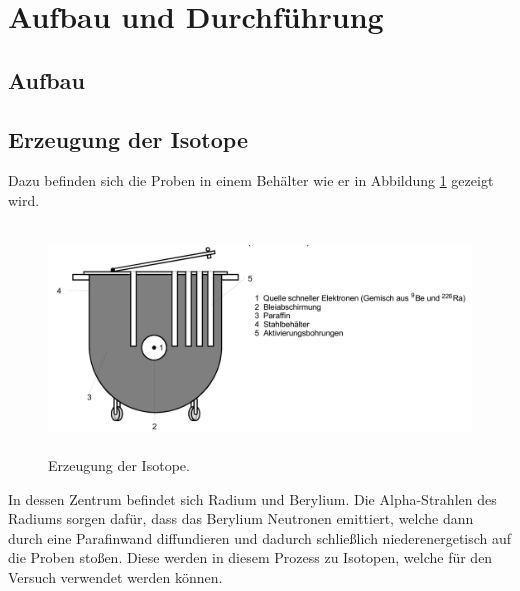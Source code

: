 \section{Aufbau und Durchführung}
\subsection{Aufbau}
\label{sec:Aufbau}
\subsection{Erzeugung der Isotope}
Dazu befinden sich die Proben in einem Behälter wie er in Abbildung \ref{abb:1} gezeigt wird.
\begin{figure}[H]
  \centering
  \includegraphics[height=6cm]{ressources/erzeugung.png}
  \caption{Erzeugung der Isotope. \cite{skript}}
  \label{abb:1}
\end{figure}
In dessen Zentrum befindet sich Radium und Berylium.
Die Alpha-Strahlen des Radiums sorgen dafür, dass das Berylium Neutronen emittiert, welche dann durch eine Parafinwand diffundieren und dadurch schließlich niederenergetisch auf die Proben stoßen.
Diese werden in diesem Prozess zu Isotopen, welche für den Versuch verwendet werden können.


